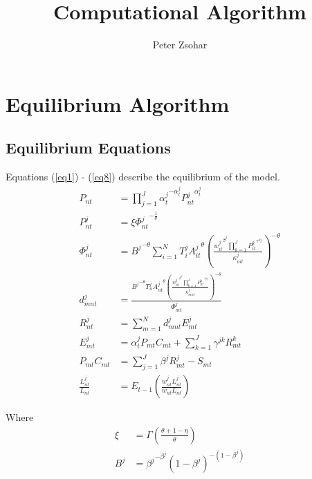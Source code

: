 \documentclass[11pt,oneside,a4paper]{article}
\title{Computational Algorithm}
\author{Peter Zsohar}
\begin{document}
\maketitle

\section{Equilibrium Algorithm}
%
\subsection{Equilibrium Equations}
Equations (\ref{eq1}) - (\ref{eq8}) describe the equilibrium of the model.
\begin{align}
  P_{nt} &= \prod_{j = 1}^J {\alpha_t^j}^{- \alpha_t^j} {P_{nt}^j}^{\alpha_t^j} \label{eq1}\\
  P_{nt}^j &= \xi {\Phi_{nt}^j}^{-\frac{1}{\theta}} \label{eq2}\\
  \Phi_{nt}^j &= {B^j}^{-\theta} \sum_{i = 1}^N T_i^j {A_{it}^j}^{\theta} \left(\frac{{w_{it}^j}^{\beta^j} \prod_{k = 1}^{J}{P_{it}^k}^{\gamma^{kj}} }{\kappa_{nit}^j}\right)^{-\theta} \label{eq3}\\
  d_{mnt}^j &= \frac{{B^j}^{-\theta} T_n^j {A_{nt}^j}^{\theta} \left(\frac{ {w_{nt}^j}^{\beta^j} \prod_{k = 1}^{J}{P_{nt}^k}^{\gamma^{kj}} }{\kappa_{mnt}^j}\right)^{-\theta}} {\Phi_{mt}^j} \label{eq4}\\
  R^j_{nt} &= \sum_{m=1}^N d^j_{mnt} E^j_{mt} \label{eq5}\\
  E^j_{mt} &= \alpha^j_t P_{mt}C_{mt} + \sum_{k=1}^J \gamma^{jk}R^k_{mt} \label{eq6}\\
  P_{mt}C_{mt} &= \sum_{j=1}^J \beta^j R_{mt}^j - S_{mt} \label{eq7}\\
  \frac{L_{nt}^{j}}{L_{nt}} &= E_{t - 1} \left( \frac{w_{nt}^j L_{nt}^j}{w_{nt} L_{nt}}\right) \label{eq8}
\end{align}

Where
\begin{align}
  \nonumber
  \xi &= \Gamma\left(\frac{\theta + 1 - \eta}{\theta}\right) \\
  \nonumber
  B^j &= {\beta^j}^{- \beta^j} (1 - \beta^j)^{-(1 - \beta^j)}
\end{align}

\newpage
\end{document}
